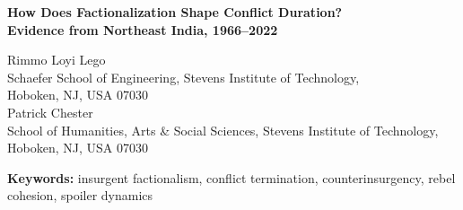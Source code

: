 \documentclass[12pt,a4paper]{article}
\begin{document}
\begin{titlepage}
\centering
\vspace*{0.2cm}
{\LARGE\bfseries How Does Factionalization Shape Conflict Duration?\\[0.3em]
\large Evidence from Northeast India, 1966--2022}

\vspace{0.6cm}
{\large Rimmo Loyi Lego\\[0.2em]
\normalsize Schaefer School of Engineering, Stevens Institute of Technology,\\Hoboken, NJ, USA 07030\\[0.5em]
\large Patrick Chester\\[0.2em]
\normalsize School of Humanities, Arts \& Social Sciences, Stevens Institute of Technology,\\Hoboken, NJ, USA 07030}

\vspace{0.5cm}
\begin{abstract}
\noindent
How does rebel factionalization impact the chances for terminating conflicts, and under which circumstances can the state be seen as a cause for factionalizing rebels? This paper utilizes a natural experiment involving two insurgent movements that resemble each other structurally within the same country, namely the Mizo National Front, resolved by the 1986 Peace Accord, and the ongoing National Socialist Council of Nagaland. In this work, we develop and apply the concept of Rebel Cohesion Index, which represents a combination of measures such as faction concentration, intrarebel combat, and plurality of ceasefires. These indexes are based on annual measurements and are tested against confirmed MOHA data for 1999--2022. By using negative binomial regression, we find that the one-standard deviation decrease in rebel cohesion is linked to 33.7 percent higher chances of conflict cases per year. Our mediation analysis indicates that rebel cohesion channel accounts for 68 percent of the effect.
\end{abstract}

\vspace{0.4cm}
\noindent\textbf{Keywords:} insurgent factionalism, conflict termination, counterinsurgency, rebel cohesion, spoiler dynamics
\end{titlepage}
\end{document}
